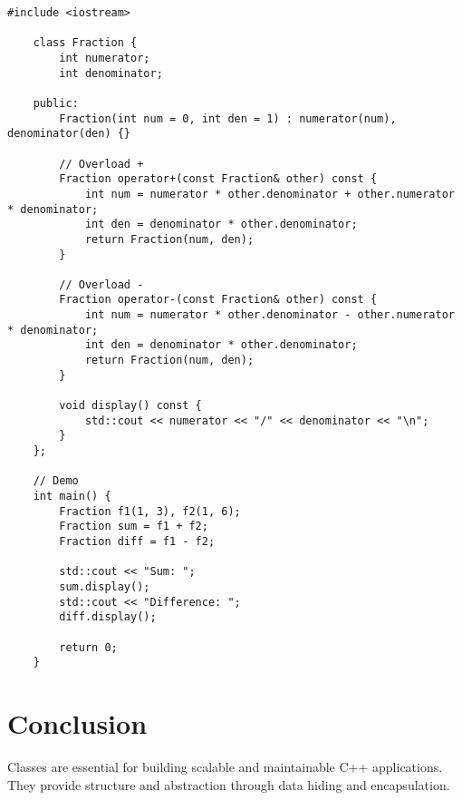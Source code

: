 \documentclass{article}
\begin{document}
\begin{lstlisting}[style=cppstyle]
	#include <iostream>

	class Fraction {
		int numerator;
		int denominator;
	
	public:
		Fraction(int num = 0, int den = 1) : numerator(num), denominator(den) {}
	
		// Overload +
		Fraction operator+(const Fraction& other) const {
			int num = numerator * other.denominator + other.numerator * denominator;
			int den = denominator * other.denominator;
			return Fraction(num, den);
		}
	
		// Overload -
		Fraction operator-(const Fraction& other) const {
			int num = numerator * other.denominator - other.numerator * denominator;
			int den = denominator * other.denominator;
			return Fraction(num, den);
		}
	
		void display() const {
			std::cout << numerator << "/" << denominator << "\n";
		}
	};
	
	// Demo
	int main() {
		Fraction f1(1, 3), f2(1, 6);
		Fraction sum = f1 + f2;
		Fraction diff = f1 - f2;
	
		std::cout << "Sum: ";
		sum.display();
		std::cout << "Difference: ";
		diff.display();
	
		return 0;
	}
\end{lstlisting}


\section{Conclusion}
Classes are essential for building scalable and maintainable C++ applications. They provide structure and abstraction through data hiding and encapsulation.
\end{document}
